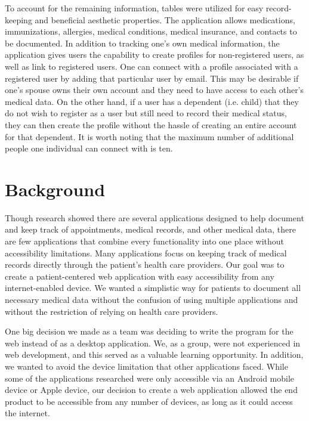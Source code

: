 \documentclass[twocolumn,12pt]{article}
\begin{document}
To account for the remaining information, tables were utilized for easy record-keeping and beneficial aesthetic properties. The application allows medications, immunizations, allergies, medical conditions, medical insurance, and contacts to be documented. In addition to tracking one’s own medical information, the application gives users the capability to create profiles for non-registered users, as well as link to registered users. One can connect with a profile associated with a registered user by adding that particular user by email. This may be desirable if one’s spouse owns their own account and they need to have access to each other’s medical data. On the other hand, if a user has a dependent (i.e. child) that they do not wish to register as a user but still need to record their medical status, they can then create the profile without the hassle of creating an entire account for that dependent. It is worth noting that the maximum number of additional people one individual can connect with is ten.  

\section{Background}
Though research showed there are several applications designed to help document and keep track of appointments, medical records, and other medical data, there are few applications that combine every functionality into one place without accessibility limitations. Many applications focus on keeping track of medical records directly through the patient's health care providers. Our goal was to create a patient-centered web application with easy accessibility from any internet-enabled device. We wanted a simplistic way for patients to document all necessary medical data without the confusion of using multiple applications and without the restriction of relying on health care providers. 

One big decision we made as a team was deciding to write the program for the web instead of as a desktop application. We, as a group, were not experienced in web development, and this served as a valuable learning opportunity. In addition, we wanted to avoid the device limitation that other applications faced. While some of the applications researched were only accessible via an Android mobile device or Apple device, our decision to create a web application allowed the end product to be accessible from any number of devices, as long as it could access the internet.
\end{document}
